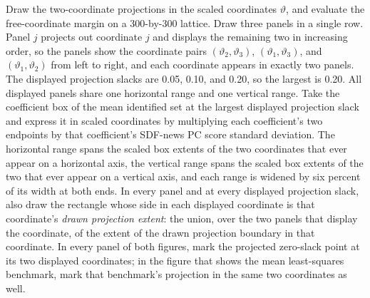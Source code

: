 \documentclass[11pt]{article}
\begin{document}
Draw the two-coordinate projections in the scaled coordinates \(\vartheta\), and evaluate the
free-coordinate margin on a 300-by-300 lattice. Draw three panels in a single row. Panel \(j\) projects out coordinate \(j\) and displays the
remaining two in increasing order, so the panels show the coordinate pairs \((\vartheta_2,\vartheta_3)\),
\((\vartheta_1,\vartheta_3)\), and \((\vartheta_1,\vartheta_2)\) from left to right, and each coordinate appears
in exactly two panels. The displayed projection slacks are 0.05, 0.10, and 0.20, so the largest
is 0.20. All displayed
panels share one horizontal range and one vertical range. Take the coefficient box of the mean
identified set at the largest displayed projection slack and express it in scaled coordinates by
multiplying each coefficient's two endpoints by that coefficient's SDF-news PC score standard
deviation. The horizontal range spans the scaled box extents
of the two coordinates that ever appear on a horizontal axis, the vertical range spans the scaled box
extents of the two that ever appear on a vertical axis, and each range is widened by six percent of
its width at both ends. In every panel and at every displayed projection slack, also draw the rectangle whose
side in each displayed coordinate is that coordinate's \emph{drawn projection extent}: the
union, over the two panels that display the coordinate, of the extent of the drawn projection
boundary in that coordinate. In every panel of both figures, mark the projected zero-slack point at
its two displayed coordinates; in the figure that shows the mean least-squares benchmark, mark that
benchmark's projection in the same two coordinates as well.
\end{document}
